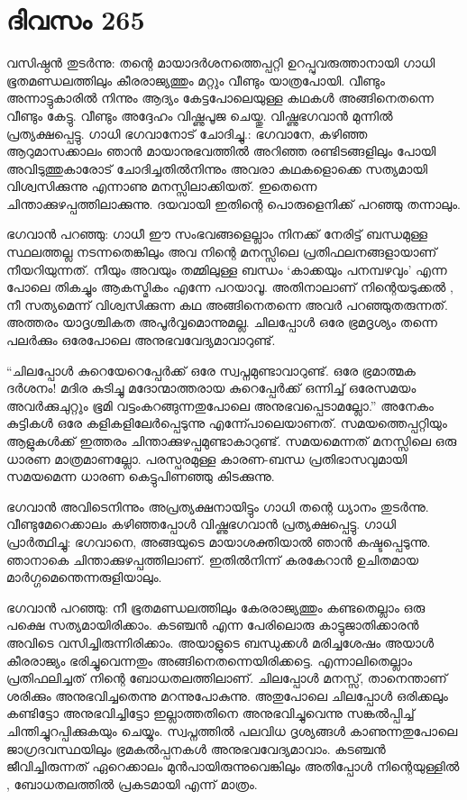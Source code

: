 \section{ദിവസം 265}


വസിഷ്ഠന്‍ തുടര്‍ന്നു: തന്റെ മായാദര്‍ശനത്തെപ്പറ്റി ഉറപ്പുവരുത്താനായി ഗാധി ഭൂതമണ്ഡലത്തിലും കീരരാജ്യത്തും മറ്റും വീണ്ടും യാത്രപോയി. വീണ്ടും അന്നാട്ടുകാരില്‍ നിന്നും ആദ്യം കേട്ടപോലെയുള്ള കഥകള്‍ അങ്ങിനെതന്നെ വീണ്ടും കേട്ടു. വീണ്ടും അദ്ദേഹം വിഷ്ണുപൂജ ചെയ്തു. വിഷ്ണുഭഗവാന്‍ മുന്നില്‍ പ്രത്യക്ഷപ്പെട്ടു. ഗാധി ഭഗവാനോട് ചോദിച്ചു.: ഭഗവാനേ, കഴിഞ്ഞ ആറുമാസക്കാലം ഞാന്‍ മായാനുഭവത്തില്‍ അറിഞ്ഞ രണ്ടിടങ്ങളിലും പോയി അവിടുത്തുകാരോട് ചോദിച്ചതില്‍നിന്നും അവരാ കഥകളൊക്കെ സത്യമായി വിശ്വസിക്കുന്നു എന്നാണു മനസ്സിലാക്കിയത്. ഇതെന്നെ ചിന്താക്കുഴപ്പത്തിലാക്കുന്നു. ദയവായി ഇതിന്റെ പൊരുളെനിക്ക് പറഞ്ഞു തന്നാലും.

ഭഗവാന്‍ പറഞ്ഞു: ഗാധീ ഈ സംഭവങ്ങളെല്ലാം നിനക്ക് നേരിട്ട് ബന്ധമുള്ള സ്ഥലത്തല്ല നടന്നതെങ്കിലും അവ നിന്റെ മനസ്സിലെ പ്രതിഫലനങ്ങളായാണ് നീയറിയുന്നത്. നീയും അവയും തമ്മിലുള്ള ബന്ധം ‘കാക്കയും പനമ്പഴവും’ എന്ന പോലെ തികച്ചും ആകസ്മികം എന്നേ പറയാവൂ. അതിനാലാണ് നിന്റെയടുക്കല്‍ , നീ സത്യമെന്ന് വിശ്വസിക്കുന്ന കഥ അങ്ങിനെതന്നെ അവര്‍ പറഞ്ഞുതരുന്നത്. അത്തരം യാദൃശ്ചികത അപൂര്‍വ്വമൊന്നുമല്ല. ചിലപ്പോള്‍ ഒരേ ഭ്രമദൃശ്യം തന്നെ പലര്‍ക്കും ഒരേപോലെ അനുഭവവേദ്യമാവാറുണ്ട്.

“ചിലപ്പോള്‍ കുറെയേറെപ്പേര്‍ക്ക് ഒരേ സ്വപ്നമുണ്ടാവാറുണ്ട്. ഒരേ ഭ്രമാത്മക ദര്‍ശനം! മദിര കുടിച്ചു മദോന്മാത്തരായ കുറെപ്പേര്‍ക്ക് ഒന്നിച്ച് ഒരേസമയം അവര്‍ക്കുചുറ്റും ഭൂമി വട്ടംകറങ്ങുന്നതുപോലെ അനുഭവപ്പെടാമല്ലോ.” അനേകം കുട്ടികള്‍ ഒരേ കളികളിലേര്‍പ്പെടുന്നു എന്ന്പോലെയാണത്. സമയത്തെപ്പറ്റിയും ആളുകള്‍ക്ക് ഇത്തരം ചിന്താക്കുഴപ്പമുണ്ടാകാറുണ്ട്. സമയമെന്നത് മനസ്സിലെ ഒരു ധാരണ മാത്രമാണല്ലോ. പരസ്പരമുള്ള കാരണ-ബന്ധ പ്രതിഭാസവുമായി സമയമെന്ന ധാരണ കെട്ടുപിണഞ്ഞു കിടക്കുന്നു.

ഭഗവാന്‍ അവിടെനിന്നും അപ്രത്യക്ഷനായിട്ടും ഗാധി തന്റെ ധ്യാനം തുടര്‍ന്നു. വീണ്ടുമേറെക്കാലം കഴിഞ്ഞപ്പോള്‍ വിഷ്ണുഭഗവാന്‍ പ്രത്യക്ഷപ്പെട്ടു. ഗാധി പ്രാര്‍ത്ഥിച്ചു: ഭഗവാനെ, അങ്ങയുടെ മായാശക്തിയാല്‍ ഞാന്‍ കഷ്ടപ്പെടുന്നു. ഞാനാകെ ചിന്താക്കുഴപ്പത്തിലാണ്. ഇതില്‍നിന്ന് കരകേറാന്‍ ഉചിതമായ മാര്‍ഗ്ഗമെന്തെന്നരുളിയാലും.
   
ഭഗവാന്‍ പറഞ്ഞു: നീ ഭൂതമണ്ഡലത്തിലും കേരരാജ്യത്തും കണ്ടതെല്ലാം ഒരു പക്ഷെ സത്യമായിരിക്കാം. കടഞ്ചന്‍ എന്ന പേരിലൊരു കാട്ടുജാതിക്കാരന്‍ അവിടെ വസിച്ചിരുന്നിരിക്കാം. അയാളുടെ ബന്ധുക്കള്‍ മരിച്ചശേഷം അയാള്‍ കീരരാജ്യം ഭരിച്ചുവെന്നതും അങ്ങിനെതന്നെയിരിക്കട്ടെ. എന്നാലിതെല്ലാം പ്രതിഫലിച്ചത് നിന്റെ ബോധതലത്തിലാണ്.  
ചിലപ്പോള്‍ മനസ്സ്, താനെന്താണ്‌ ശരിക്കും അനുഭവിച്ചതെന്നു മറന്നുപോകുന്നു. അതുപോലെ ചിലപ്പോള്‍ ഒരിക്കലും കണ്ടിട്ടോ അനുഭവിച്ചിട്ടോ ഇല്ലാത്തതിനെ അനുഭവിച്ചുവെന്നു സങ്കല്‍പ്പിച്ച് ചിന്തിച്ചുറപ്പിക്കുകയും ചെയ്യും. സ്വപ്നത്തില്‍ പലവിധ ദൃശ്യങ്ങള്‍ കാണുന്നതുപോലെ ജാഗ്രദവസ്ഥയിലും ഭ്രമകല്‍പ്പനകള്‍ അനുഭവവേദ്യമാവാം. കടഞ്ചന്‍ ജീവിച്ചിരുന്നത് ഏറെക്കാലം മുന്‍പായിരുന്നുവെങ്കിലും അതിപ്പോള്‍ നിന്റെയുള്ളില്‍ , ബോധതലത്തില്‍ പ്രകടമായി എന്ന് മാത്രം.

